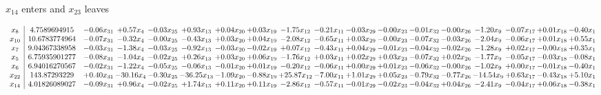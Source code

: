 \documentclass[9pt]{article}
\begin{document}
 $ x_{14} $ enters and $ x_{23} $ leaves 

 \[\begin{array}{c| c c@{\hskip 2pt} c@{\hskip 2pt} c@{\hskip 2pt} c@{\hskip 2pt} c@{\hskip 2pt} c@{\hskip 2pt} c@{\hskip 2pt} c@{\hskip 2pt} c@{\hskip 2pt} c@{\hskip 2pt} c@{\hskip 2pt} c@{\hskip 2pt} c@{\hskip 2pt} c@{\hskip 2pt} c@{\hskip 2pt} c@{\hskip 2pt} }
 x_{8}   &  4.7589694915 & -0.06 x_{31} & +  0.57 x_{4} & -0.03 x_{25} & +  0.93 x_{13} & +  0.04 x_{20} & +  0.03 x_{19} & -1.75 x_{12} & -0.21 x_{11} & -0.03 x_{29} & -0.00 x_{23} & -0.01 x_{32} & -0.00 x_{26} & -1.20 x_{9} & -0.07 x_{17} & +  0.01 x_{18} & -0.40 x_{1}\\
 x_{10}   &  10.6783774964 & -0.07 x_{31} & -0.32 x_{4} & -0.00 x_{25} & -0.43 x_{13} & +  0.03 x_{20} & +  0.04 x_{19} & -2.08 x_{12} & -0.65 x_{11} & +  0.03 x_{29} & -0.00 x_{23} & -0.07 x_{32} & -0.03 x_{26} & -2.04 x_{9} & -0.06 x_{17} & +  0.01 x_{18} & +  0.55 x_{1}\\
 x_{7}   &  9.04367338958 & -0.03 x_{31} & -1.38 x_{4} & -0.03 x_{25} & -0.92 x_{13} & -0.03 x_{20} & -0.02 x_{19} & +  0.07 x_{12} & -0.43 x_{11} & +  0.04 x_{29} & -0.01 x_{23} & -0.04 x_{32} & -0.02 x_{26} & -1.28 x_{9} & +  0.02 x_{17} & -0.00 x_{18} & +  0.35 x_{1}\\
 x_{5}   &  6.75935901277 & -0.08 x_{31} & -1.04 x_{4} & -0.02 x_{25} & +  0.26 x_{13} & +  0.03 x_{20} & +  0.06 x_{19} & -1.76 x_{12} & +  0.03 x_{11} & +  0.02 x_{29} & +  0.03 x_{23} & -0.07 x_{32} & +  0.02 x_{26} & -1.77 x_{9} & -0.05 x_{17} & -0.03 x_{18} & -0.08 x_{1}\\
 x_{6}   &  6.94016270567 & -0.02 x_{31} & -1.22 x_{4} & -0.05 x_{25} & -0.06 x_{13} & -0.01 x_{20} & +  0.01 x_{19} & -0.20 x_{12} & -0.06 x_{11} & +  0.00 x_{29} & +  0.01 x_{23} & -0.06 x_{32} & -0.00 x_{26} & -1.02 x_{9} & +  0.00 x_{17} & -0.01 x_{18} & -0.40 x_{1}\\
 x_{22}   &  143.87293229 & +  0.40 x_{31} & -30.16 x_{4} & -0.30 x_{25} & -36.25 x_{13} & -1.09 x_{20} & -0.88 x_{19} & + 25.87 x_{12} & -7.00 x_{11} & +  1.01 x_{29} & +  0.05 x_{23} & -0.79 x_{32} & -0.77 x_{26} & -14.54 x_{9} & +  0.63 x_{17} & -0.43 x_{18} & +  5.10 x_{1}\\
 x_{14}   &  4.01826089027 & -0.09 x_{31} & +  0.96 x_{4} & -0.02 x_{25} & +  1.74 x_{13} & +  0.11 x_{20} & +  0.11 x_{19} & -2.86 x_{12} & -0.57 x_{11} & -0.01 x_{29} & -0.02 x_{23} & -0.04 x_{32} & +  0.04 x_{26} & -2.41 x_{9} & -0.04 x_{17} & +  0.06 x_{18} & -0.38 x_{1}\\

\end{array}\]
\end{document}
